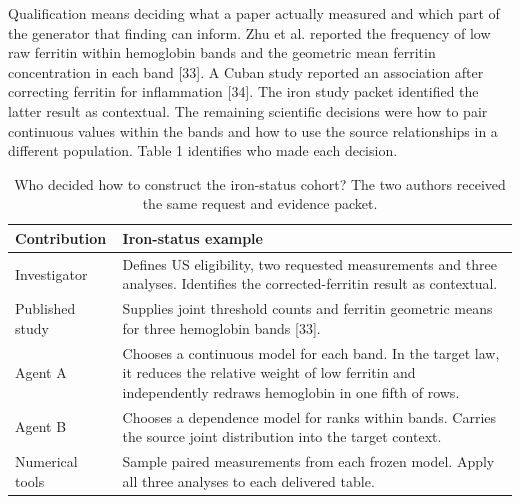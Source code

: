 \documentclass[sigconf,review]{acmart}
\begin{document}
Qualification means deciding what a paper actually measured and which part of the generator that finding can inform. Zhu et al. reported the frequency of low raw ferritin within hemoglobin bands and the geometric mean ferritin concentration in each band [33]. A Cuban study reported an association after correcting ferritin for inflammation [34]. The iron study packet identified the latter result as contextual. The remaining scientific decisions were how to pair continuous values within the bands and how to use the source relationships in a different population. Table 1 identifies who made each decision.


\begin{table}[tp]

\caption{Who decided how to construct the iron-status cohort? The two authors received the same request and evidence packet.}

\label{tab:1}

\centering\small

\renewcommand{\arraystretch}{1.12}

\begin{tabularx}{\textwidth}{@{}>{\raggedright\arraybackslash}p{}>{\raggedright\arraybackslash}X@{}}

\toprule

Contribution & Iron-status example \\

\midrule

Investigator & Defines US eligibility, two requested measurements and three analyses. Identifies the corrected-ferritin result as contextual. \\

Published study & Supplies joint threshold counts and ferritin geometric means for three hemoglobin bands [33]. \\

Agent A & Chooses a continuous model for each band. In the target law, it reduces the relative weight of low ferritin and independently redraws hemoglobin in one fifth of rows. \\

Agent B & Chooses a dependence model for ranks within bands. Carries the source joint distribution into the target context. \\

Numerical tools & Sample paired measurements from each frozen model. Apply all three analyses to each delivered table. \\

\bottomrule

\end{tabularx}

\end{table}
\end{document}
